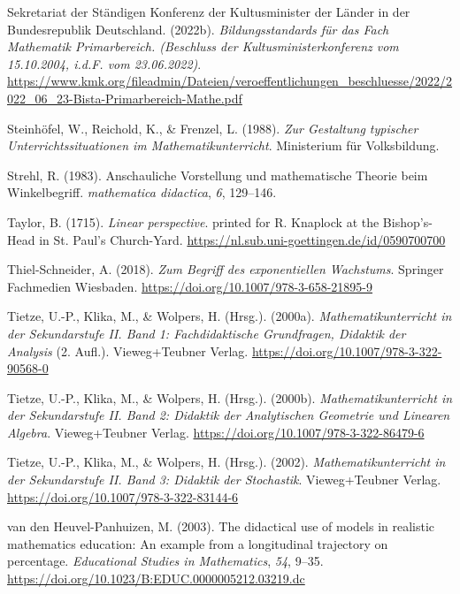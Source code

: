 \documentclass[
]{scrbook}
\newlength{\cslhangindent}
\newenvironment{CSLReferences}[2] %
 {\begin{list}{}{%
  \setlength{\itemindent}{0pt}
  \setlength{\leftmargin}{0pt}
  \setlength{\parsep}{0pt}
  \ifodd #1
   \setlength{\leftmargin}{\cslhangindent}
   \setlength{\itemindent}{-1\cslhangindent}
  \fi
  \setlength{\itemsep}{#2\baselineskip}}}
 {\end{list}}
\theoremstyle{definition}
\theoremstyle{definition}
\theoremstyle{definition}
\theoremstyle{definition}
\theoremstyle{remark}
\begin{document}
\begin{CSLReferences}{1}{0}
Sekretariat der Ständigen Konferenz der Kultusminister der Länder in der Bundesrepublik Deutschland. (2022b). \emph{Bildungsstandards für das {Fach} {Mathematik} {Primarbereich}. ({Beschluss} der {Kultusministerkonferenz} vom 15.10.2004, i.d.{F}. vom 23.06.2022)}. \url{https://www.kmk.org/fileadmin/Dateien/veroeffentlichungen_beschluesse/2022/2022_06_23-Bista-Primarbereich-Mathe.pdf}

Steinhöfel, W., Reichold, K., \& Frenzel, L. (1988). \emph{Zur {Gestaltung} typischer {Unterrichtssituationen} im {Mathematikunterricht}}. Ministerium für Volksbildung.

Strehl, R. (1983). Anschauliche {Vorstellung} und mathematische {Theorie} beim {Winkelbegriff}. \emph{mathematica didactica}, \emph{6}, 129--146.

Taylor, B. (1715). \emph{Linear perspective}. printed for R. Knaplock at the Bishop's-Head in St. Paul's Church-Yard. \url{https://nl.sub.uni-goettingen.de/id/0590700700}

Thiel-Schneider, A. (2018). \emph{Zum {Begriff} des exponentiellen {Wachstums}}. Springer Fachmedien Wiesbaden. \url{https://doi.org/10.1007/978-3-658-21895-9}

Tietze, U.-P., Klika, M., \& Wolpers, H. (Hrsg.). (2000a). \emph{Mathematikunterricht in der {Sekundarstufe} {II}. {Band} 1: {Fachdidaktische} {Grundfragen}, {Didaktik} der {Analysis}} (2. Aufl.). Vieweg+Teubner Verlag. \url{https://doi.org/10.1007/978-3-322-90568-0}

Tietze, U.-P., Klika, M., \& Wolpers, H. (Hrsg.). (2000b). \emph{Mathematikunterricht in der {Sekundarstufe} {II}. {Band} 2: {Didaktik} der {Analytischen} {Geometrie} und {Linearen} {Algebra}}. Vieweg+Teubner Verlag. \url{https://doi.org/10.1007/978-3-322-86479-6}

Tietze, U.-P., Klika, M., \& Wolpers, H. (Hrsg.). (2002). \emph{Mathematikunterricht in der {Sekundarstufe} {II}. {Band} 3: {Didaktik} der {Stochastik}}. Vieweg+Teubner Verlag. \url{https://doi.org/10.1007/978-3-322-83144-6}

van den Heuvel-Panhuizen, M. (2003). The didactical use of models in realistic mathematics education: {An} example from a longitudinal trajectory on percentage. \emph{Educational Studies in Mathematics}, \emph{54}, 9--35. \url{https://doi.org/10.1023/B:EDUC.0000005212.03219.dc}


\end{CSLReferences}
\end{document}
